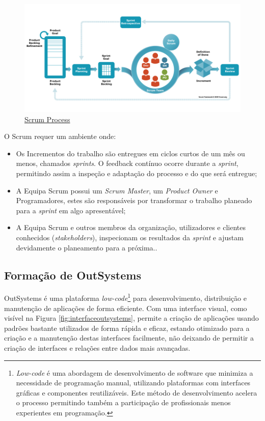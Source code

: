       \begin{figure}[H]
          \centering
          \includegraphics[scale=0.50]{imgs/scrum.png}
          \caption{\href{https://www.scrum.org/resources/what-scrum-module}{Scrum Process}}\label{fig:scrum}
      \end{figure}

      O Scrum requer um ambiente onde:
      \begin{itemize}
        \item Os Incrementos do trabalho são entregues em ciclos curtos de um mês ou menos, chamados \textit{sprints}. O feedback contínuo ocorre durante a \textit{sprint}, permitindo assim a inspeção e adaptação do processo e do que será entregue;
        \item A Equipa Scrum possui um \textit{Scrum Master}, um \textit{Product Owner} e Programadores, estes são responsáveis por transformar o trabalho planeado para a \textit{sprint} em algo apresentável;
        \item A Equipa Scrum e outros membros da organização, utilizadores e clientes conhecidos (\textit{stakeholders}), inspecionam os resultados da \textit{sprint} e ajustam devidamente o planeamento para a próxima.\cite{scrum}.
      \end{itemize}
    
    \subsection{Formação de OutSystems}\label{subsec:outsystems}

      OutSystems é uma plataforma \textit{low-code}\footnote{\textit{Low-code} é uma abordagem de desenvolvimento de software que minimiza a necessidade de programação manual, utilizando plataformas com interfaces gráficas e componentes reutilizáveis. Este método de desenvolvimento acelera o processo permitindo também a participação de profissionais menos experientes em programação.} para desenvolvimento, distribuição e manutenção de aplicações de forma eficiente. Com uma interface visual, como visível na Figura \ref{fig:interfaceoutsystems}, permite a criação de aplicações usando padrões bastante utilizados de forma rápida e eficaz, estando otimizado para a criação e a manutenção destas interfaces facilmente, não deixando de permitir a criação de interfaces e relações entre dados mais avançadas.

